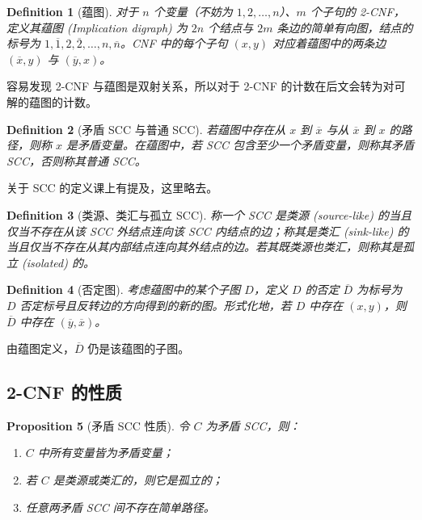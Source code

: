 \documentclass[10pt,a4paper,oneside]{article}
\newtheorem{definition}{Definition}[section]
\newtheorem{proposition}[definition]{Proposition}
\begin{document}
\begin{definition}[蕴图]
    对于 $n$ 个变量（不妨为 $1,2,\ldots ,n$）、$m$ 个子句的 2-CNF，定义其蕴图 (Implication digraph) 为 $2n$ 个结点与 $2m$ 条边的简单有向图，结点的标号为 $1, \overline{1}, 2, \overline{2}, \ldots, n, \overline{n}$。CNF 中的每个子句 $(x,y)$ 对应着蕴图中的两条边 $(\overline{x},y)$ 与 $(\overline{y},x)$。
\end{definition}

容易发现 2-CNF 与蕴图是双射关系，所以对于 2-CNF 的计数在后文会转为对可解的蕴图的计数。

\begin{definition}[矛盾 SCC 与普通 SCC]
    若蕴图中存在从 $x$ 到 $\overline{x}$ 与从 $\overline{x}$ 到 $x$ 的路径，则称 $x$ 是矛盾变量。在蕴图中，若 SCC 包含至少一个矛盾变量，则称其矛盾 SCC，否则称其普通 SCC。
\end{definition}

关于 SCC 的定义课上有提及，这里略去。

\begin{definition}[类源、类汇与孤立 SCC]
    称一个 SCC 是类源 (source-like) 的当且仅当不存在从该 SCC 外结点连向该 SCC 内结点的边；称其是类汇 (sink-like) 的当且仅当不存在从其内部结点连向其外结点的边。若其既类源也类汇，则称其是孤立 (isolated) 的。
\end{definition}

\begin{definition}[否定图]
    考虑蕴图中的某个子图 $D$，定义 $D$ 的否定 $\overline{D}$ 为标号为 $D$ 否定标号且反转边的方向得到的新的图。形式化地，若 $D$ 中存在 $(x,y)$，则 $\overline{D}$ 中存在 $(\overline{y},\overline{x})$。
\end{definition}

由蕴图定义，$\overline{D}$ 仍是该蕴图的子图。

\subsection{2-CNF 的性质}

\begin{proposition}[矛盾 SCC 性质]
    令 $C$ 为矛盾 SCC，则：
    \begin{enumerate}
        \item $C$ 中所有变量皆为矛盾变量；
        \item 若 $C$ 是类源或类汇的，则它是孤立的；
        \item 任意两矛盾 SCC 间不存在简单路径。
    \end{enumerate}
\end{proposition}
\end{document}
